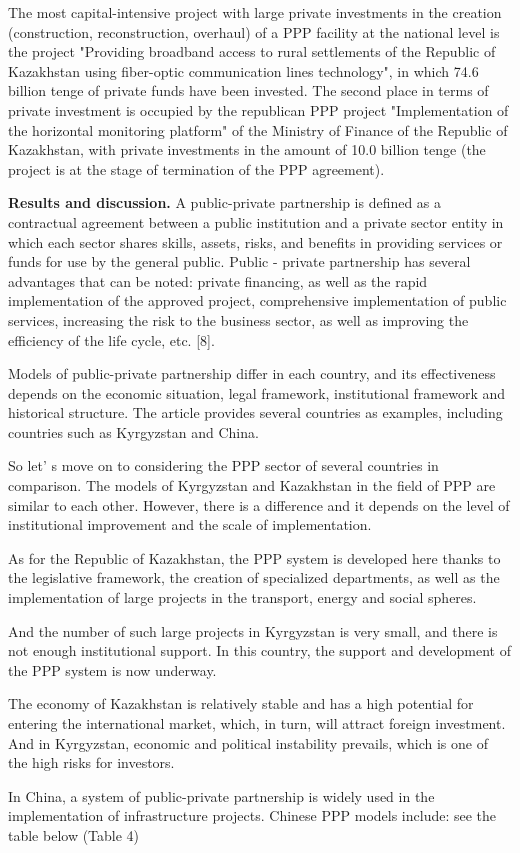 \begin{multicols}{2}
The most capital-intensive project with large private investments in the
creation (construction, reconstruction, overhaul) of a PPP facility at
the national level is the project "Providing broadband access to rural
settlements of the Republic of Kazakhstan using fiber-optic
communication lines technology", in which 74.6 billion tenge of private
funds have been invested. The second place in terms of private
investment is occupied by the republican PPP project "Implementation of
the horizontal monitoring platform" of the Ministry of Finance of the
Republic of Kazakhstan, with private investments in the amount of 10.0
billion tenge (the project is at the stage of termination of the PPP
agreement).

{\bfseries Results and discussion.} A public-private partnership is defined
as a contractual agreement between a public institution and a private
sector entity in which each sector shares skills, assets, risks, and
benefits in providing services or funds for use by the general public.
Public - private partnership has several advantages that can be noted:
private financing, as well as the rapid implementation of the approved
project, comprehensive implementation of public services, increasing the
risk to the business sector, as well as improving the efficiency of the
life cycle, etc. {[}8{]}.

Models of public-private partnership differ in each country, and its
effectiveness depends on the economic situation, legal framework,
institutional framework and historical structure. The article provides
several countries as examples, including countries such as Kyrgyzstan
and China.

So let' s move on to considering the PPP sector of
several countries in comparison. The models of Kyrgyzstan and Kazakhstan
in the field of PPP are similar to each other. However, there is a
difference and it depends on the level of institutional improvement and
the scale of implementation.

As for the Republic of Kazakhstan, the PPP system is developed here
thanks to the legislative framework, the creation of specialized
departments, as well as the implementation of large projects in the
transport, energy and social spheres.

And the number of such large projects in Kyrgyzstan is very small, and
there is not enough institutional support. In this country, the support
and development of the PPP system is now underway.

The economy of Kazakhstan is relatively stable and has a high potential
for entering the international market, which, in turn, will attract
foreign investment. And in Kyrgyzstan, economic and political
instability prevails, which is one of the high risks for investors.

In China, a system of public-private partnership is widely used in the
implementation of infrastructure projects. Chinese PPP models include:
see the table below (Table 4)
\end{multicols}

